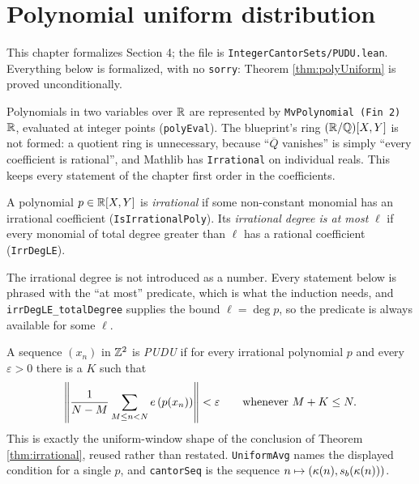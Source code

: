 \chapter{Polynomial uniform distribution}
\label{chap:pudu}

This chapter formalizes Section 4; the file is
\texttt{IntegerCantorSets/PUDU.lean}. Everything below is formalized, with no
\texttt{sorry}: Theorem \ref{thm:polyUniform} is proved unconditionally.

Polynomials in two variables over $\mathbb{R}$ are represented by
\texttt{MvPolynomial (Fin 2) $\mathbb{R}$}, evaluated at integer points
(\texttt{polyEval}). The blueprint's ring $(\mathbb{R}/\mathbb{Q})[X,Y]$ is not formed: a
quotient ring is unnecessary, because ``$\overline{Q}$ vanishes'' is simply
``every coefficient is rational'', and Mathlib has \texttt{Irrational} on
individual reals. This keeps every statement of the chapter first order in the
coefficients.

\begin{definition}
  \label{def:irrationalPoly}
  \leanok
  A polynomial $p \in \mathbb{R}[X,Y]$ is \emph{irrational} if some non-constant
  monomial has an irrational coefficient (\texttt{IsIrrationalPoly}). Its
  \emph{irrational degree is at most} $\ell$ if every monomial of total degree
  greater than $\ell$ has a rational coefficient (\texttt{IrrDegLE}).

  The irrational degree is not introduced as a number. Every statement below is
  phrased with the ``at most'' predicate, which is what the induction needs,
  and \texttt{irrDegLE\_totalDegree} supplies the bound $\ell = \deg p$, so the
  predicate is always available for some $\ell$.
\end{definition}

\begin{definition}[PUDU]
  \label{def:PUDU}
  \leanok
  A sequence $(x_n)$ in $\mathbb{Z}^2$ is \emph{PUDU} if for every irrational
  polynomial $p$ and every $\varepsilon > 0$ there is a $K$ such that
  \[
    \left\lVert  \frac{1}{N-M}\sum_{M \leq n < N} e\left(p(x_n)\right)  \right\rVert < \varepsilon
    \qquad \text{whenever } M + K \leq N .
  \]
  This is exactly the uniform-window shape of the conclusion of Theorem
  \ref{thm:irrational}, reused rather than restated.
  \texttt{UniformAvg} names the displayed condition for a single $p$, and
  \texttt{cantorSeq} is the sequence $n \mapsto (\kappa(n), s_b(\kappa(n)))$.
\end{definition}

